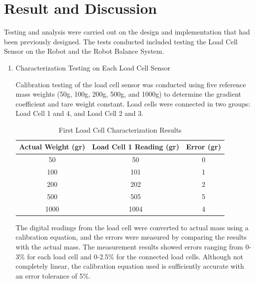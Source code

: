 \section{Result and Discussion}
\label{sec:resultanddiscussion}

Testing and analysis were carried out on the design and implementation that had been previously designed. The tests conducted included testing the Load Cell Sensor on the Robot and the Robot Balance System.

\begin{enumerate}[label=\Alph*.]

    \item Characterization Testing on Each Load Cell Sensor
    \label{subsec:results-discussion-characterization}

        \hspace*{1em} Calibration testing of the load cell sensor was conducted using five reference mass weights (50g, 100g, 200g, 500g, and 1000g) to determine the gradient coefficient and tare weight constant. Load cells were connected in two groups: Load Cell 1 and 4, and Load Cell 2 and 3.

        \begin{table}[h]
            \centering
            \caption{First Load Cell Characterization Results}
            \begin{tabular}{|c|c|c|}
                \hline
                \textbf{Actual Weight (gr)} & \textbf{Load Cell 1 Reading (gr)} & \textbf{Error (gr)} \\
                \hline
                50    & 50    & 0   \\
                100   & 101   & 1   \\
                200   & 202   & 2   \\
                500   & 505   & 5   \\
                1000  & 1004  & 4   \\
                \hline
            \end{tabular}
            \label{tab:Kalibrasi_Load_Cell_1}
        \end{table}
        
        \hspace*{1em} The digital readings from the load cell were converted to actual mass using a calibration equation, and the errors were measured by comparing the results with the actual mass. The measurement results showed errors ranging from 0-3\% for each load cell and 0-2.5\% for the connected load cells. Although not completely linear, the calibration equation used is sufficiently accurate with an error tolerance of 5\%.


\end{enumerate}
